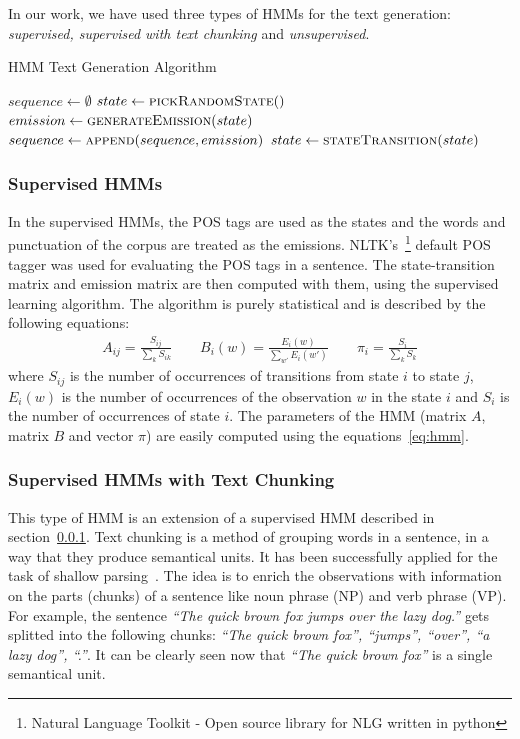 \documentclass[a4paper,12pt]{article}
\begin{document}
In our work, we have used three types of HMMs for the text generation:
\textit{supervised, supervised with text chunking} and \textit{unsupervised}.

\begin{algorithm}
\caption{HMM Text Generation Algorithm}
\label{alg:hmm}
\begin{algorithmic}[1]
	\State $sequence \gets \emptyset$
	\State $state \gets \Call{pickRandomState}$
	\Repeat
		\State $emission \gets \Call{generateEmission}{state}$
		\State $sequence \gets \Call{append}{sequence, emission}$
		\State $state \gets \Call{stateTransition}{state}$
	 \\
\end{algorithmic}
\end{algorithm}

\subsubsection{Supervised HMMs}
\label{sec:suphmm}
In the supervised HMMs, the POS tags are used as the states and the words and
punctuation of the corpus are treated as the emissions. NLTK's~\footnote{Natural
Language Toolkit - Open source library for NLG written in python} default POS
tagger was used for evaluating the POS tags in a sentence. The state-transition
matrix and emission matrix are then computed with them, using the supervised
learning algorithm. The algorithm is purely statistical and is described by the
following equations:
\begin{align}
\label{eq:hmm}
A_{ij} = \frac{S_{ij}}{\sum_{k} S_{ik}} \qquad
B_{i}(w) = \frac{E_{i}(w)}{\sum_{w'} E_{i}(w')} \qquad
\pi_{i} = \frac{S_{i}}{\sum_{k} S_{k}}
\end{align}
where $S_{ij}$ is the number of occurrences of transitions from state $i$ to
state $j$, $E_{i}(w)$ is the number of occurrences of the observation $w$ in the
state $i$ and $S_{i}$ is the number of occurrences of state $i$. The
parameters of the HMM (matrix $A$, matrix $B$ and vector $\pi$) are easily
computed using the equations~\ref{eq:hmm}.

\subsubsection{Supervised HMMs with Text Chunking}
This type of HMM is an extension of a supervised HMM described in
section~\ref{sec:suphmm}. Text chunking is a method of grouping words in a
sentence, in a way that they produce semantical units. It has been successfully 
applied for the task of shallow parsing~\cite{hmmchunk}. The idea is to enrich the
observations with information on the parts (chunks) of a sentence like noun
phrase (NP) and verb phrase (VP). For example, the sentence
\textit{``The quick brown fox jumps over the lazy dog.''} gets splitted into the
following chunks: \textit{``The quick brown fox'', ``jumps'', ``over'', ``a lazy
dog'', ``.''}. It can be clearly seen now that \textit{``The quick brown fox''}
is a single semantical unit.
\end{document}
